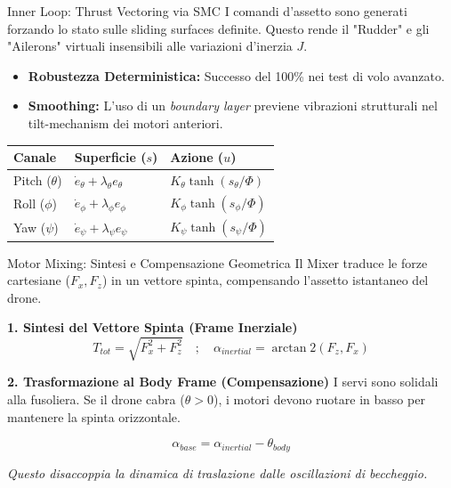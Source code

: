 \documentclass[aspectratio=169]{beamer} %
\begin{document}
\begin{frame}{Inner Loop: Thrust Vectoring via SMC}
    I comandi d'assetto sono generati forzando lo stato sulle sliding surfaces definite. Questo rende il "Rudder" e gli "Ailerons" virtuali insensibili alle variazioni d'inerzia $J$.

    \vspace{0.3cm}
    \begin{itemize}
        \item \textbf{Robustezza Deterministica:} Successo del 100\% nei test di volo avanzato.
        \item \textbf{Smoothing:} L'uso di un \textit{boundary layer} previene vibrazioni strutturali nel tilt-mechanism dei motori anteriori.
    \end{itemize}

    \begin{table}[]
        \centering
        \small
        \begin{tabular}{l l l}
            \toprule
            \textbf{Canale} & \textbf{Superficie ($s$)} & \textbf{Azione ($u$)} \\
            \midrule
            Pitch ($\theta$) & $\dot{e}_\theta + \lambda_\theta e_\theta$ & $K_\theta \tanh(s_\theta/\Phi)$ \\
            Roll ($\phi$) & $\dot{e}_\phi + \lambda_\phi e_\phi$ & $K_\phi \tanh(s_\phi/\Phi)$ \\
            Yaw ($\psi$) & $\dot{e}_\psi + \lambda_\psi e_\psi$ & $K_\psi \tanh(s_\psi/\Phi)$ \\
            \bottomrule
        \end{tabular}
    \end{table}
\end{frame}

\begin{frame}{Motor Mixing: Sintesi e Compensazione Geometrica}
    Il Mixer traduce le forze cartesiane ($F_x, F_z$) in un vettore spinta, compensando l'assetto istantaneo del drone.

    \vspace{0.3cm}
    \textbf{1. Sintesi del Vettore Spinta (Frame Inerziale)}
    \begin{equation}
        T_{tot} = \sqrt{F_{x}^2 + F_{z}^2} \quad ; \quad \alpha_{inertial} = \arctan2(F_z, F_x)
    \end{equation}

    \vspace{0.3cm}
    \textbf{2. Trasformazione al Body Frame (Compensazione)}
    I servi sono solidali alla fusoliera. Se il drone cabra ($\theta > 0$), i motori devono ruotare in basso per mantenere la spinta orizzontale.
    
    \begin{equation}
        \boxed{\alpha_{base} = \alpha_{inertial} - \theta_{body}}
    \end{equation}
    
    \small \textit{Questo disaccoppia la dinamica di traslazione dalle oscillazioni di beccheggio.}
\end{frame}
\end{document}
